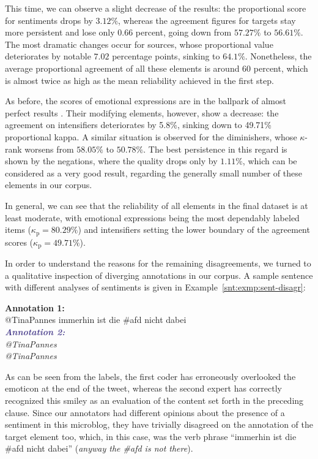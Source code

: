 This time, we can observe a slight decrease of the results: the
proportional score for sentiments drops by $3.12\%$, whereas the
agreement figures for targets stay more persistent and lose only 0.66
percent, going down from $57.27\%$ to $56.61\%$.  The most dramatic
changes occur for sources, whose proportional value deteriorates by
notable $7.02$ percentage points, sinking to $64.1\%$.  Nonetheless,
the average proportional agreement of all these elements is around 60
percent, which is almost twice as high as the mean reliability
achieved in the first step.

As before, the scores of emotional expressions are in the ballpark of
almost perfect results \cite[cf.][]{Landis:77}.  Their modifying
elements, however, show a decrease: the agreement on intensifiers
deteriorates by 5.8\%, sinking down to 49.71\% proportional kappa.  A
similar situation is observed for the diminishers, whose $\kappa$-rank
worsens from $58.05\%$ to $50.78\%$.  The best persistence in this
regard is shown by the negations, where the quality drops only by
$1.11\%$, which can be considered as a very good result, regarding the
generally small number of these elements in our corpus.

In general, we can see that the reliability of all elements in the
final dataset is at least moderate, with emotional expressions being
the most dependably labeled items ($\kappa_{\textrm{p}}=80.29\%$) and
intensifiers setting the lower boundary of the agreement scores
($\kappa_{\textrm{p}}=49.71\%$).

In order to understand the reasons for the remaining disagreements, we
turned to a qualitative inspection of diverging annotations in our
corpus.  A sample sentence with different analyses of sentiments is
given in Example~\ref{snt:exmp:sent-disagr}:
\begin{example}\label{snt:exmp:sent-disagr}
  \textcolor{red3}{\textbf{Annotation 1:}}\\ \upshape{}@TinaPannes
  immerhin ist die \#afd nicht dabei \smiley{}\\[0.8em]\itshape
  \noindent\textcolor{darkslateblue}{\textbf{\itshape Annotation
      2:}}\\ \upshape{}@TinaPannes
  \\[0.8em]
  \noindent\itshape{}@TinaPannes
  \upshape{}
\end{example}
As can be seen from the labels, the first coder has erroneously
overlooked the emoticon \smiley{} at the end of the tweet, whereas the
second expert has correctly recognized this smiley as an evaluation of
the content set forth in the preceding clause.  Since our annotators
had different opinions about the presence of a sentiment in this
microblog, they have trivially disagreed on the annotation of the
target element too, which, in this case, was the verb phrase
``immerhin ist die \#afd nicht dabei'' (\emph{anyway the \#afd is not
  there}).

